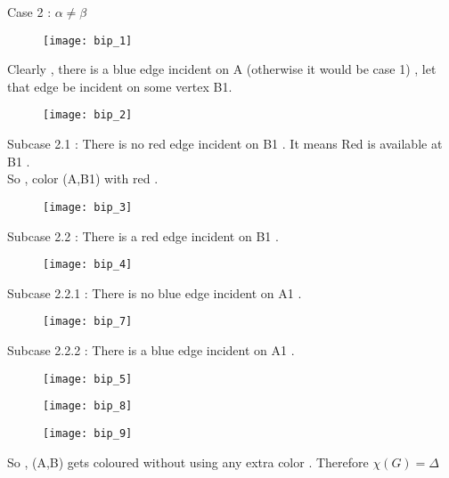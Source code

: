 \documentclass[12pt]{beamer}
\begin{document}
\begin{frame}{}

Case 2 : $\alpha \neq \beta$ \\
\begin{figure}
\texttt{[image: bip\_1]}
\end{figure}
Clearly , there is a blue edge incident on A (otherwise it would be case 1) , let that edge be incident on some vertex B1.

\begin{figure}
\texttt{[image: bip\_2]}
\end{figure}

\end{frame}

\begin{frame}
Subcase 2.1 : There is no red edge incident on B1 . It means Red is available at B1 . \\
So , color (A,B1) with red .
\begin{figure}
\texttt{[image: bip\_3]}
\end{figure}

Subcase 2.2 : There is a red edge incident on B1 .
\begin{figure}
\texttt{[image: bip\_4]}
\end{figure}
\end{frame}

\begin{frame}
Subcase 2.2.1 : There is no blue edge incident on A1 .
\begin{figure}
\texttt{[image: bip\_7]}
\end{figure}


\end{frame}

\begin{frame}
Subcase 2.2.2 : There is a blue edge incident on A1 . 
\begin{figure}
\texttt{[image: bip\_5]}
\end{figure}

\end{frame}

\begin{frame}
\begin{figure}
\texttt{[image: bip\_8]}
\end{figure}
\end{frame}

\begin{frame}
\begin{figure}
\texttt{[image: bip\_9]}
\end{figure}
So , (A,B) gets coloured without using any extra color .
Therefore $\chi(G) = \Delta$ 
\end{frame}
\end{document}
